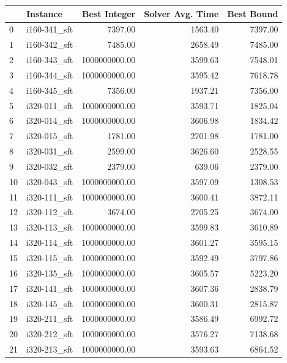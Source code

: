 \begin{tabular}{llrrr}
\toprule
{} &      Instance &  Best Integer &  Solver Avg. Time &  Best Bound \\
\midrule
0  &  i160-341\_sft &       7397.00 &           1563.40 &     7397.00 \\
1  &  i160-342\_sft &       7485.00 &           2658.49 &     7485.00 \\
2  &  i160-343\_sft & 1000000000.00 &           3599.63 &     7548.01 \\
3  &  i160-344\_sft & 1000000000.00 &           3595.42 &     7618.78 \\
4  &  i160-345\_sft &       7356.00 &           1937.21 &     7356.00 \\
5  &  i320-011\_sft & 1000000000.00 &           3593.71 &     1825.04 \\
6  &  i320-014\_sft & 1000000000.00 &           3606.98 &     1834.42 \\
7  &  i320-015\_sft &       1781.00 &           2701.98 &     1781.00 \\
8  &  i320-031\_sft &       2599.00 &           3626.60 &     2528.55 \\
9  &  i320-032\_sft &       2379.00 &            639.06 &     2379.00 \\
10 &  i320-043\_sft & 1000000000.00 &           3597.09 &     1308.53 \\
11 &  i320-111\_sft & 1000000000.00 &           3600.41 &     3872.11 \\
12 &  i320-112\_sft &       3674.00 &           2705.25 &     3674.00 \\
13 &  i320-113\_sft & 1000000000.00 &           3599.83 &     3610.89 \\
14 &  i320-114\_sft & 1000000000.00 &           3601.27 &     3595.15 \\
15 &  i320-115\_sft & 1000000000.00 &           3592.49 &     3797.86 \\
16 &  i320-135\_sft & 1000000000.00 &           3605.57 &     5223.20 \\
17 &  i320-141\_sft & 1000000000.00 &           3607.36 &     2838.79 \\
18 &  i320-145\_sft & 1000000000.00 &           3600.31 &     2815.87 \\
19 &  i320-211\_sft & 1000000000.00 &           3586.49 &     6992.72 \\
20 &  i320-212\_sft & 1000000000.00 &           3576.27 &     7138.68 \\
21 &  i320-213\_sft & 1000000000.00 &           3593.63 &     6864.52 \\

\end{tabular}
